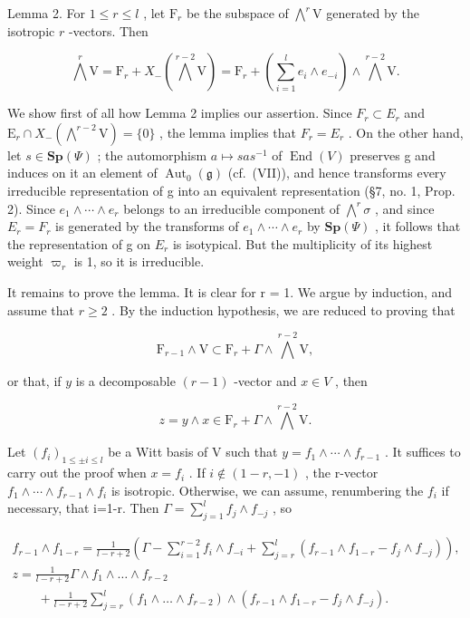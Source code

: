 Lemma 2. For \(1 \leq r \leq l\) , let \(\mathrm{F}_r\) be the subspace of \(\bigwedge^r\mathrm{V}\) generated by the isotropic \(r\) -vectors. Then

\[
\bigwedge^ {r} \mathrm{V} = \mathrm{F} _ {r} + X _ {-} (\bigwedge^ {r - 2} \mathrm{V}) = \mathrm{F} _ {r} + \left(\sum_ {i = 1} ^ {l} e _ {i} \wedge e _ {- i}\right) \wedge \bigwedge^ {r - 2} \mathrm{V}.
\]

We show first of all how Lemma 2 implies our assertion. Since \(F_{r} \subset E_{r}\) and \(\mathrm{E}_{r} \cap X_{-}(\bigwedge^{r-2}\mathrm{V}) = \{0\}\) , the lemma implies that \(F_{r} = E_{r}\) . On the other hand, let \(s \in \mathbf{Sp}(\varPsi)\) ; the automorphism \(a \mapsto sas^{-1}\) of \(\operatorname{End}(V)\) preserves g and induces on it an element of \(\operatorname{Aut}_{0}(\mathfrak{g})\) (cf.~(VII)), and hence transforms every irreducible representation of g into an equivalent representation (§7, no. 1, Prop. 2). Since \(e_{1} \wedge \cdots \wedge e_{r}\) belongs to an irreducible component of \(\bigwedge^{r}\sigma\) , and since \(E_{r} = F_{r}\) is generated by the transforms of \(e_{1} \wedge \cdots \wedge e_{r}\) by \(\mathbf{Sp}(\varPsi)\) , it follows that the representation of g on \(E_{r}\) is isotypical. But the multiplicity of its highest weight \(\varpi_{r}\) is 1, so it is irreducible.

It remains to prove the lemma. It is clear for r = 1. We argue by induction, and assume that \(r \geq 2\) . By the induction hypothesis, we are reduced to proving that

\[
\mathrm{F} _ {r - 1} \wedge \mathrm{V} \subset \mathrm{F} _ {r} + \Gamma \wedge \bigwedge^ {r - 2} \mathrm{V},
\]

or that, if \(y\) is a decomposable \((r - 1)\) -vector and \(x \in V\) , then

\[
z = y \wedge x \in \mathrm{F} _ {r} + \Gamma \wedge \bigwedge^ {r - 2} \mathrm{V}.
\]

Let \((f_{i})_{1\leq\pm i\leq l}\) be a Witt basis of V such that \(y=f_{1}\wedge\cdots\wedge f_{r-1}\) . It suffices to carry out the proof when \(x=f_{i}\) . If \(i\notin(1-r,-1)\) , the r-vector \(f_{1}\wedge\cdots\wedge f_{r-1}\wedge f_{i}\) is isotropic. Otherwise, we can assume, renumbering the \(f_{i}\) if necessary, that i=1-r. Then \(\Gamma=\sum_{j=1}^{l}f_{j}\wedge f_{-j}\) , so

\[
\begin{array}{l} f _ {r - 1} \wedge f _ {1 - r} = \frac {1}{l - r + 2} \left(\Gamma - \sum_ {i = 1} ^ {r - 2} f _ {i} \wedge f _ {- i} + \sum_ {j = r} ^ {l} (f _ {r - 1} \wedge f _ {1 - r} - f _ {j} \wedge f _ {- j})\right), \\ z = \frac {1}{l - r + 2} \Gamma \wedge f _ {1} \wedge \dots \wedge f _ {r - 2} \\ \qquad + \frac {1}{l - r + 2} \sum_ {j = r} ^ {l} (f _ {1} \wedge \dots \wedge f _ {r - 2}) \wedge (f _ {r - 1} \wedge f _ {1 - r} - f _ {j} \wedge f _ {- j}). \end{array}
\]

